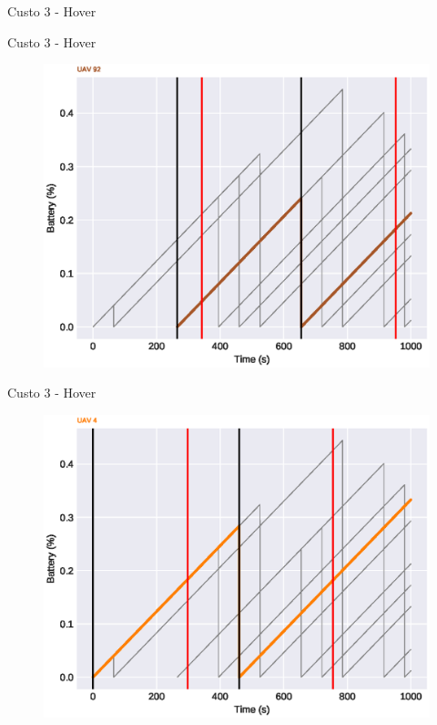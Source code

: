 \begin{frame}{Custo 3 - Hover}
\begin{figure}[!htb]
                 \end{figure}
            \end{frame}\begin{frame}{Custo 3 - Hover}
                \begin{figure}[!htb]
                     \includegraphics[width=\textwidth]{custo_3/uav_hover_acum_uav_6.eps}
                 \end{figure}
            \end{frame}\begin{frame}{Custo 3 - Hover}
                \begin{figure}[!htb]
                     \includegraphics[width=\textwidth]{custo_3/uav_hover_acum_uav_4.eps}

\end{figure}
\end{frame}

